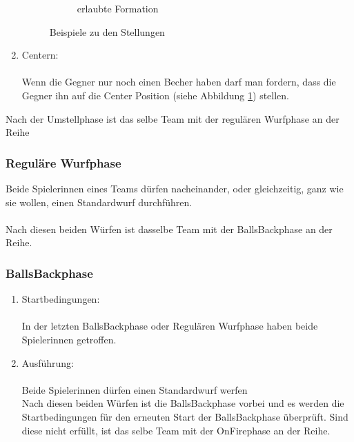 \documentclass[a5paper, 12pt]{book}
\begin{document}
\begin{enumerate}[(1)]
\begin{figure}[h!]
\begin{subfigure}[b]{0.434\textwidth}
         \caption{erlaubte Formation}
     \end{subfigure}
        \caption{Beispiele zu den Stellungen}
        \label{fig:three graphs}
\end{figure}
\item
    Centern: \\\\
    Wenn die Gegner nur noch einen Becher haben darf man fordern, dass die Gegner ihn auf die Center Position (siehe Abbildung \ref{fig:three graphs}) stellen. 
\end{enumerate}
Nach der Umstellphase ist das selbe Team mit der regulären Wurfphase an der Reihe
\subsubsection{Reguläre Wurfphase} \label{reguläreWurfphase}
Beide Spielerinnen eines Teams dürfen nacheinander, oder gleichzeitig, ganz wie sie wollen, einen Standardwurf durchführen.\\\\ Nach diesen beiden Würfen ist dasselbe Team mit der BallsBackphase an der Reihe.
\subsubsection{BallsBackphase}\label{ballsbackphase}
\begin{enumerate}[(1)]
    \item Startbedingungen:\\\\
    In der letzten BallsBackphase oder Regulären Wurfphase haben beide Spielerinnen getroffen.
    \item Ausführung:\\\\
    Beide Spielerinnen dürfen einen Standardwurf werfen\\
Nach diesen beiden Würfen ist die BallsBackphase vorbei und es werden die Startbedingungen für den erneuten Start der BallsBackphase überprüft. Sind diese nicht erfüllt, ist das selbe Team mit der OnFirephase an der Reihe.

\end{enumerate}
\end{document}
